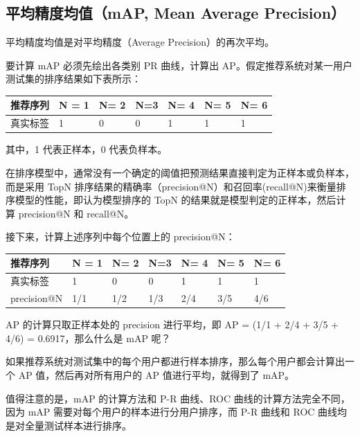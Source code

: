 \documentclass[12pt]{article}
\begin{document}
\subsection{平均精度均值（mAP, Mean Average Precision）}
平均精度均值是对平均精度（Average Precision）的再次平均。

要计算 mAP 必须先绘出各类别 PR 曲线，计算出 AP。假定推荐系统对某一用户测试集的排序结果如下表所示：
\begin{table}[h]
\begin{center}  
\begin{tabular}{|l|l|l|l|l|l|l|}  
\hline  
 推荐序列 & N = 1 & N= 2 & N=3 & N= 4 & N= 5 & N= 6 \\ \hline  
 真实标签 & 1 & 0 & 0 & 1 & 1 & 1 \\  \hline
\end{tabular}  
\end{center}
\end{table}

其中，1 代表正样本，0 代表负样本。

在排序模型中，通常没有一个确定的阈值把预测结果直接判定为正样本或负样本，而是采用 TopN 排序结果的精确率（precision@N）和召回率(recall@N)来衡量排序模型的性能，即认为模型排序的 TopN 的结果就是模型判定的正样本，然后计算 precision@N 和 recall@N。

接下来，计算上述序列中每个位置上的 precision@N：
\begin{table}[h]
\begin{center}  
\begin{tabular}{|l|l|l|l|l|l|l|}  
\hline  
 推荐序列 & N = 1 & N= 2 & N=3 & N= 4 & N= 5 & N= 6 \\ \hline  
 真实标签 & 1 & 0 & 0 & 1 & 1 & 1 \\  \hline
 precision@N & 1/1 & 1/2 & 1/3 & 2/4 & 3/5 & 4/6 \\  \hline
\end{tabular}  
\end{center}
\end{table}

AP 的计算只取正样本处的 precision 进行平均，即 AP = (1/1 + 2/4 + 3/5 + 4/6) = 0.6917，那么什么是 mAP 呢？

如果推荐系统对测试集中的每个用户都进行样本排序，那么每个用户都会计算出一个 AP 值，然后再对所有用户的 AP 值进行平均，就得到了 mAP。

值得注意的是，mAP 的计算方法和 P-R 曲线、ROC 曲线的计算方法完全不同，因为 mAP 需要对每个用户的样本进行分用户排序，而 P-R 曲线和 ROC 曲线均是对全量测试样本进行排序。
\end{document}
